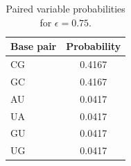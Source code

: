 \begin{table}[H]
\centering\small
\caption{Paired variable probabilities for $\epsilon=0.75$.}
\label{tab:pairedinit}
\begin{tabular}{@{}lc@{}}
\toprule
Base pair & Probability\\
\midrule
CG & 0.4167\\
GC & 0.4167\\
AU & 0.0417\\
UA & 0.0417\\
GU & 0.0417\\
UG & 0.0417\\
\bottomrule
\end{tabular}
\end{table}
